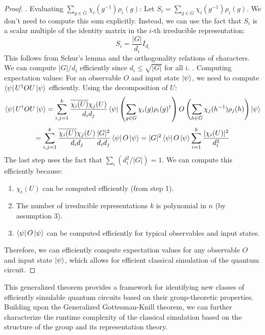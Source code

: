 \documentclass[11pt,a4paper]{article}
\begin{document}
\begin{proof}
. Evaluating $\sum_{g \in G} \chi_i(g^{-1}) \rho_i(g)$:
Let $S_i = \sum_{g \in G} \chi_i(g^{-1}) \rho_i(g)$. We don't need to compute this sum explicitly. Instead, we can use the fact that $S_i$ is a scalar multiple of the identity matrix in the $i$-th irreducible representation:
\begin{equation}
S_i = \frac{|G|}{d_i} I_{d_i}
\end{equation}
This follows from Schur's lemma and the orthogonality relations of characters. We can compute $|G|/d_i$ efficiently since $d_i \leq \sqrt{|G|}$ for all $i$.
. Computing expectation values:
For an observable $O$ and input state $\ket{\psi}$, we need to compute $\bra{\psi}U^\dagger O U\ket{\psi}$ efficiently. Using the decomposition of $U$:
\[
\bra{\psi}U^\dagger O U\ket{\psi} = \sum_{i,j=1}^k \frac{\overline{\chi_i(U)}\chi_j(U)}{d_i d_j} \bra{\psi}\left(\sum_{g \in G} \chi_i(g) \rho_i(g)^\dagger\right) O \left(\sum_{h \in G} \chi_j(h^{-1}) \rho_j(h)\right)\ket{\psi} \]\[
= \sum_{i,j=1}^k \frac{\overline{\chi_i(U)}\chi_j(U)}{d_i d_j} \frac{|G|^2}{d_i d_j} \bra{\psi}O\ket{\psi} 
= |G|^2 \bra{\psi}O\ket{\psi} \sum_{i=1}^k \frac{|\chi_i(U)|^2}{d_i^2}
\]
The last step uses the fact that $\sum_i (d_i^2 / |G|) = 1$. We can compute this efficiently because:
\begin{enumerate}
\item $\chi_i(U)$ can be computed efficiently (from step 1).
\item The number of irreducible representations $k$ is polynomial in $n$ (by assumption 3).
\item $\bra{\psi}O\ket{\psi}$ can be computed efficiently for typical observables and input states.
\end{enumerate}
Therefore, we can efficiently compute expectation values for any observable $O$ and input state $\ket{\psi}$, which allows for efficient classical simulation of the quantum circuit.
\end{proof}
This generalized theorem provides a framework for identifying new classes of efficiently simulable quantum circuits based on their group-theoretic properties.
\noindent Building upon the Generalized Gottesman-Knill theorem, we can further characterize the runtime complexity of the classical simulation based on the structure of the group and its representation theory.
\end{document}
